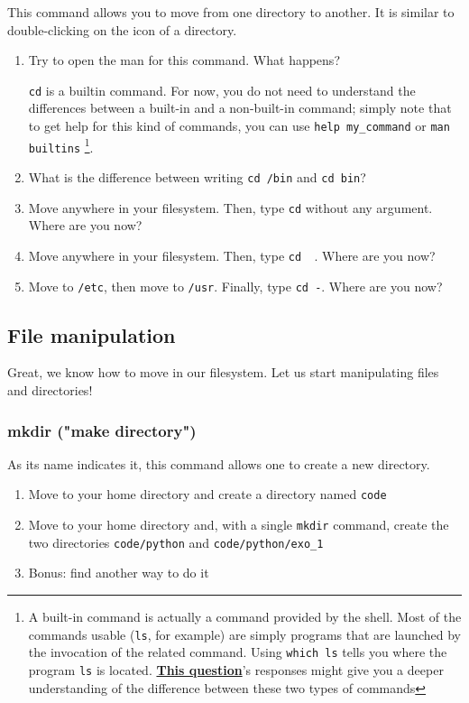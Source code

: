 \documentclass[12pt]{article}
\let\oldhref\href
\renewcommand{\href}[2]{\oldhref{#1}{\bfseries#2}}
\begin{document}
This command allows you to move from one directory to another. It is similar to double-clicking on the icon of a directory.


\begin{enumerate}
\item Try to open the man for this command. What happens?

\texttt{cd} is a builtin command. For now, you do not need to understand the differences between a built-in and a non-built-in command; simply note that to get help for this kind of commands,
you can use \texttt{help my\_command} or \texttt{man builtins}
\footnote{A built-in command is actually a command provided by the shell. Most of the commands usable (\texttt{ls}, for example) are simply programs that are launched by the invocation of the related command. Using \texttt{which ls} tells you where the program \texttt{ls} is located. \href{https://unix.stackexchange.com/questions/11454/what-is-the-difference-between-a-builtin-command-and-one-that-is-not}{This question}'s responses might give you a deeper understanding of the difference between these two types of commands}.
\item What is the difference between writing \texttt{cd /bin} and \texttt{cd bin}?
\item Move anywhere in your filesystem. Then, type \texttt{cd} without any argument. Where are you now?
\item Move anywhere in your filesystem. Then, type \texttt{cd ~}. Where are you now?
\item Move to \texttt{/etc}, then move to \texttt{/usr}. Finally, type \texttt{cd -}. Where are you now?
\end{enumerate}


\subsection{File manipulation}

Great, we know how to move in our filesystem. Let us start manipulating files and directories!

\subsubsection{mkdir ("make directory")}

As its name indicates it, this command allows one to create a new directory.
\begin{enumerate}
\item Move to your home directory and create a directory named \texttt{code}
\item Move to your home directory and, with a single \texttt{mkdir} command, create the two directories \texttt{code/python} and \texttt{code/python/exo\_1}
\item Bonus: find another way to do it
\end{enumerate}
\end{document}
